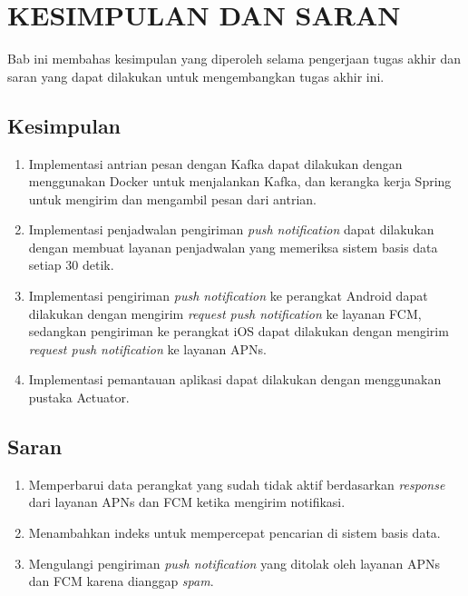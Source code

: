 \chapter{KESIMPULAN DAN SARAN}
\par Bab ini membahas kesimpulan yang diperoleh selama pengerjaan tugas akhir dan saran yang dapat dilakukan untuk mengembangkan tugas akhir ini.

\section{Kesimpulan}
\begin{enumerate}
	\item Implementasi antrian pesan dengan Kafka dapat dilakukan dengan menggunakan Docker untuk menjalankan Kafka, dan kerangka kerja Spring untuk mengirim dan mengambil pesan dari antrian.
	\item Implementasi penjadwalan pengiriman \textit{push notification} dapat dilakukan dengan membuat layanan penjadwalan yang memeriksa sistem basis data setiap 30 detik.
	\item Implementasi pengiriman \textit{push notification} ke perangkat Android dapat dilakukan dengan mengirim \textit{request push notification} ke layanan FCM, sedangkan pengiriman ke perangkat iOS dapat dilakukan dengan mengirim \textit{request push notification} ke layanan APNs.
	\item Implementasi pemantauan aplikasi dapat dilakukan dengan menggunakan pustaka Actuator.
\end{enumerate}

\section{Saran}
\begin{enumerate}
    \item Memperbarui data perangkat yang sudah tidak aktif berdasarkan \textit{response} dari layanan APNs dan FCM ketika mengirim notifikasi.
    \item Menambahkan indeks untuk mempercepat pencarian di sistem basis data.
    \item Mengulangi pengiriman \textit{push notification} yang ditolak oleh layanan APNs dan FCM karena dianggap \textit{spam}.
\end{enumerate}
